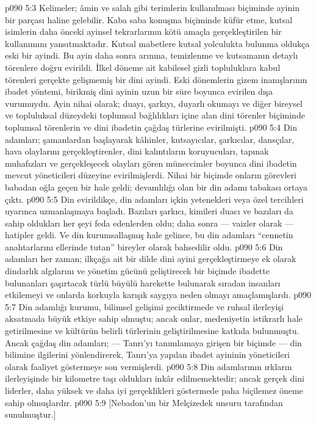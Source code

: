 \vs p090 5:3 Kelimeler; âmin ve salah gibi terimlerin kullanılması biçiminde ayinin bir parçası haline gelebilir. Kaba saba konuşma biçiminde küfür etme, kutsal isimlerin daha önceki ayinsel tekrarlarının kötü amaçla gerçekleştirilen bir kullanımını yansıtmaktadır. Kutsal mabetlere kutsal yolculukta bulunma oldukça eski bir ayindi. Bu ayin daha sonra arınma, temizlenme ve kutsamanın detaylı törenlere doğru evirildi. İlkel döneme ait kabilesel gizli topluluklara kabul törenleri gerçekte gelişmemiş bir dini ayindi. Eski dönemlerin gizem inanışlarının ibadet yöntemi, birikmiş dini ayinin uzun bir süre boyunca evirilen dışa vurumuydu. Ayin nihai olarak; duayı, şarkıyı, duyarlı okumayı ve diğer bireysel ve topluluksal düzeydeki toplumsal bağlılıkları içine alan dini törenler biçiminde toplumsal törenlerin ve dini ibadetin çağdaş türlerine evirilmişti.
\vs p090 5:4 Din adamları; şamanlardan başlayarak kâhinler, kutsayıcılar, şarkıcılar, dansçılar, hava olaylarını gerçekleştirenler, dini kalıntıların koruyucuları, tapınak muhafızları ve gerçekleşecek olayları gören müneccimler boyunca dini ibadetin mevcut yöneticileri düzeyine evirilmişlerdi. Nihai bir biçimde onların görevleri babadan oğla geçen bir hale geldi; devamlılığı olan bir din adamı tabakası ortaya çıktı.
\vs p090 5:5 Din evirildikçe, din adamları içkin yetenekleri veya özel tercihleri uyarınca uzmanlaşmaya başladı. Bazıları şarkıcı, kimileri duacı ve bazıları da sahip oldukları her şeyi feda edenlerden oldu; daha sonra --- vaizler olarak --- hatipler geldi. Ve din kurumsallaşmış hale gelince, bu din adamları “cennetin anahtarlarını ellerinde tutan” bireyler olarak bahsedilir oldu.
\vs p090 5:6 Din adamları her zaman; ilkçağa ait bir dilde dini ayini gerçekleştirmeye ek olarak dindarlık algılarını ve yönetim gücünü geliştirecek bir biçimde ibadette bulunanları şaşırtacak türlü büyülü harekette bulunarak sıradan insanları etkilemeyi ve onlarda korkuyla karışık saygıya neden olmayı amaçlamışlardı.
\vs p090 5:7 Din adamlığı kurumu, bilimsel gelişimi geciktirmede ve ruhsal ilerleyişi aksatmada büyük etkiye sahip olmuştu; ancak onlar, medeniyetin istikrarlı hale getirilmesine ve kültürün belirli türlerinin geliştirilmesine katkıda bulunmuştu. Ancak çağdaş din adamları; --- Tanrı’yı tanımlamaya girişen bir biçimde --- din bilimine ilgilerini yönlendirerek, Tanrı’ya yapılan ibadet ayininin yöneticileri olarak faaliyet göstermeye son vermişlerdi.
\vs p090 5:8 Din adamlarının ırkların ilerleyişinde bir kilometre taşı oldukları inkâr edilmemektedir; ancak gerçek dini liderler, daha yüksek ve daha iyi gerçeklikleri göstermede paha biçilemez öneme sahip olmuşlardır.
\vs p090 5:9 [Nebadon’un bir Melçizedek unsuru tarafından sunulmuştur.]
